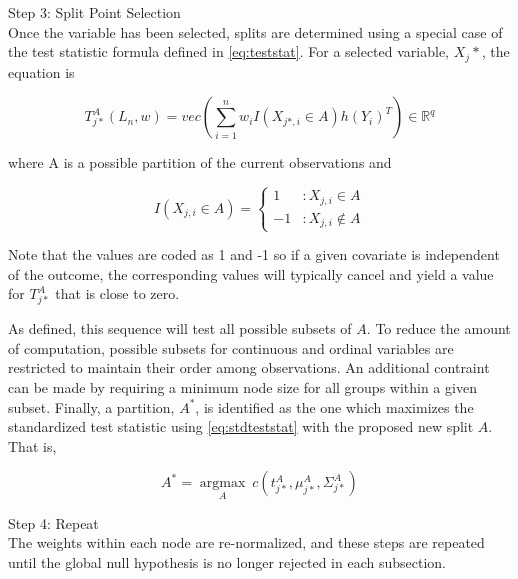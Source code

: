 \vspace{3ex}

\noindent Step 3: Split Point Selection \\

Once the variable has been selected, splits are determined using a special case of the test statistic formula defined in \autoref{eq:teststat}. For a selected variable, $X_j*$, the equation is 

\begin{equation}
T_{j*}^A(L_n, w) = vec\left ( \sum_{i=1}^{n}w_iI(X_{j*,i} \in A)h(Y_i)^T \right ) \in \mathbb{R}^q
\end{equation}

\noindent where A is a possible partition of the current observations and

\begin{equation}
I(X_{j,i} \in A) = \left\{
     \begin{array}{rr}
       1 & : X_{j,i} \in A \\
       -1 & : X_{j,i} \notin A
     \end{array}
   \right.
\end{equation}

Note that the values are coded as 1 and -1 so if a given covariate is independent of the outcome, the corresponding values will typically cancel and yield a value for $T_{j*}^A$ that is close to zero.

As defined, this sequence will test all possible subsets of $A$. To reduce the amount of computation, possible subsets for continuous and ordinal variables are restricted to maintain their order among observations. An additional contraint can be made by requiring a minimum node size for all groups within a given subset. Finally, a partition, $A^*$, is identified as the one which maximizes the standardized test statistic using \autoref{eq:stdteststat} with the proposed new split $A$. That is,

\begin{equation}
A^* = \underset{A}{\operatorname{argmax}} \ c(t_{j*}^A, \mu_{j*}^A, \Sigma_{j*}^A)
\end{equation}

\vspace{1ex}

\noindent Step 4: Repeat \\

The weights within each node are re-normalized, and these steps are repeated until the global null hypothesis is no longer rejected in each subsection.


